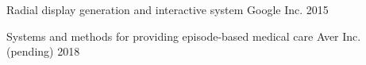 

\begin{cvhonors}

  \cvhonor
    {Radial display generation and interactive system}
    {Google Inc.}
    {} %
    {2015} %

  \cvhonor
    {Systems and methods for providing episode-based medical care}
    {Aver Inc. (pending)}
    {} %
    {2018} %

\end{cvhonors}
